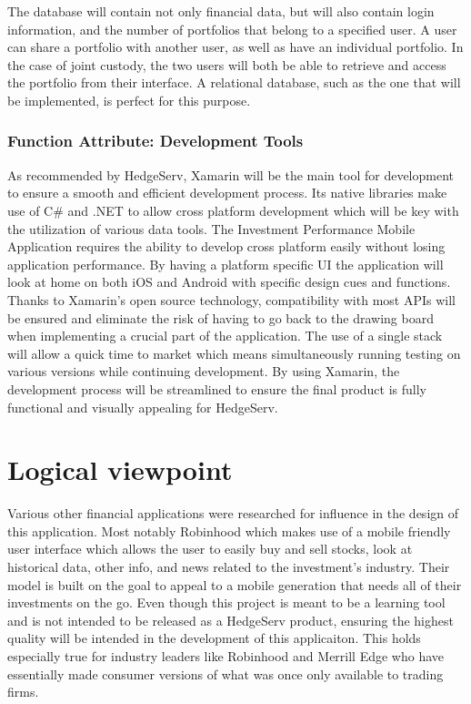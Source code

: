 \documentclass[onecolumn, draftclsnofoot,10pt, compsoc]{IEEEtran}
\begin{document}
        The database will contain not only financial data, but will also contain login information, and the number of portfolios that belong to a specified user. A user can share a portfolio
        with another user, as well as have an individual portfolio. In the case of joint custody, the two users will both be able to retrieve and access the portfolio from their interface.
        A relational database, such as the one that will be implemented, is perfect for this purpose.

\subsubsection{Function Attribute: Development Tools}
    As recommended by HedgeServ, Xamarin will be the main tool for development to ensure a smooth and efficient development process. Its native libraries make use of C\# and .NET to allow cross platform
    development which will be key with the utilization of various data tools. The Investment Performance Mobile Application requires the ability to develop cross platform easily without losing 
    application performance. By having a platform specific UI the application will look at home on both iOS and Android with specific design cues and functions. Thanks to Xamarin's open source technology,
    compatibility with most APIs will be ensured and eliminate the risk of having to go back to the drawing board when implementing a crucial part of the application. The use of a single stack will allow 
    a quick time to market which means simultaneously running testing on various versions while continuing development. By using Xamarin, the development process will be streamlined to ensure the final product
    is fully functional and visually appealing for HedgeServ. 


\section{Logical viewpoint}
        Various other financial applications were researched for influence in the design of this application. Most notably Robinhood which makes use of a mobile friendly user interface which allows the user to
	easily buy and sell stocks, look at historical data, other info, and news related to the investment's industry. Their model is built on the goal to appeal to a mobile generation that needs all of their
	investments on the go. Even though this project is meant to be a learning tool and is not intended to be released as a HedgeServ product, ensuring the highest quality will be intended in the development
	of this applicaiton. This holds especially true for industry leaders like Robinhood and Merrill Edge who have essentially made consumer versions of what was once only available to trading firms. 
     
\end{document}
